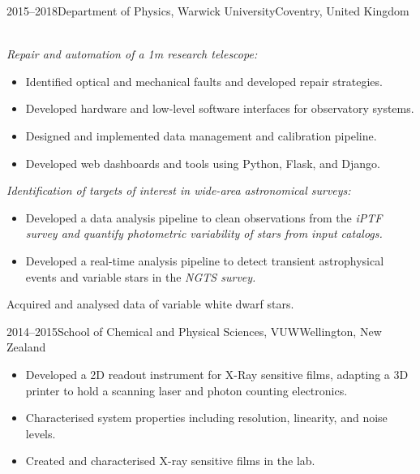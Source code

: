 \documentclass[print]{cv-style}
\begin{document}
\begin{entrylist}
\entry
  {2015--2018}{Department of Physics, Warwick University}{Coventry, United Kingdom}
  {\\
  \vspace{-3mm}
  \it{Repair and automation of a 1m research telescope:}\vspace{-1mm}\\
  \begin{itemize}
    \item Identified optical and mechanical faults and developed repair strategies.
    \item Developed hardware and low-level software interfaces for observatory systems.
    \item Designed and implemented data management and calibration pipeline.
    \item Developed web dashboards and tools using Python, Flask, and Django.
  \end{itemize}
  \it{Identification of targets of interest in wide-area astronomical surveys:}
  \begin{itemize}
    \item Developed a data analysis pipeline to clean observations from the \it{iPTF} survey and quantify photometric variability of stars from input catalogs.
    \item Developed a real-time analysis pipeline to detect transient astrophysical events and variable stars in the \it{NGTS} survey.
  \end{itemize}
  Acquired and analysed data of variable white dwarf stars.
}
\entry
  {2014--2015}{School of Chemical and Physical Sciences, VUW}{Wellington, New Zealand}
  {
  \begin{itemize}
    \item Developed a 2D readout instrument for X-Ray sensitive films, adapting a 3D printer to hold a scanning laser and photon counting electronics.
    \item Characterised system properties including resolution, linearity, and noise levels.
    \item Created and characterised X-ray sensitive films in the lab.
  \end{itemize}
}

\end{entrylist}
\end{document}
